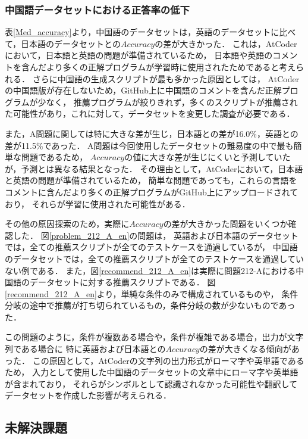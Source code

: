   \subsubsection{中国語データセットにおける正答率の低下}
  表\ref{Med_accuracy}より，中国語のデータセットは，英語のデータセットに比べて，日本語のデータセットとの$Accuracy$の差が大きかった．
  これは，AtCoder\cite{AtCoder}において，日本語と英語の問題が準備されているため，
  日本語や英語のコメントを含んだより多くの正解プログラムが学習時に使用されたためであると考えられる．
  さらに中国語の生成スクリプトが最も多かった原因としては，
  AtCoderの中国語版が存在しないため，GitHub上に中国語のコメントを含んだ正解プログラムが少なく，
  推薦プログラムが絞りきれず，多くのスクリプトが推薦された可能性があり，これに対して，データセットを変更した調査が必要である．
  
  また，A問題に関しては特に大きな差が生じ，日本語との差が16.0\%，英語との差が11.5\%であった．
  A問題は今回使用したデータセットの難易度の中で最も簡単な問題であるため，
  $Accuracy$の値に大きな差が生じにくいと予測していたが，予測とは異なる結果となった．
  その理由として，AtCoder\cite{AtCoder}において，日本語と英語の問題が準備されているため，
  簡単な問題であっても，これらの言語をコメントに含んだより多くの正解プログラムがGitHub上にアップロードされており，
  それらが学習に使用された可能性がある．

  その他の原因探索のため，実際に$Accuracy$の差が大きかった問題をいくつか確認した．
  図\ref{problem_212_A_en}の問題は，
  英語および日本語のデータセットでは，全ての推薦スクリプトが全てのテストケースを通過しているが，
  中国語のデータセットでは，全ての推薦スクリプトが全てのテストケースを通過していない例である．
  また，図\ref{recommend_212_A_en}は実際に問題212-Aにおける中国語のデータセットに対する推薦スクリプトである．
  図\ref{recommend_212_A_en}より，単純な条件のみで構成されているものや，
  条件分岐の途中で推薦が打ち切られているもの，条件分岐の数が少ないものであった．
  
  この問題のように，条件が複数ある場合や，条件が複雑である場合，出力が文字列である場合に
  特に英語および日本語との$Accuracy$の差が大きくなる傾向があった．
  この原因として，AtCoderの文字列の出力形式がローマ字や英単語であるため，
  入力として使用した中国語のデータセットの文章中にローマ字や英単語が含まれており，
  それらがシンボルとして認識されなかった可能性や翻訳してデータセットを作成した影響が考えられる．


  \subsection{未解決課題\label{open_issues}}
